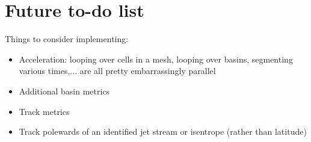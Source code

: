 \documentclass[a4paper]{article}
\begin{document}
\section{Future to-do list}
Things to consider implementing:
\begin{itemize}
\item Acceleration: looping over cells in a mesh, looping over basins, segmenting various times,... are all pretty embarrassingly parallel
\item Additional basin metrics
\item Track metrics
\item Track polewards of an identified jet stream or isentrope (rather than latitude)
\end{itemize}
\end{document}
